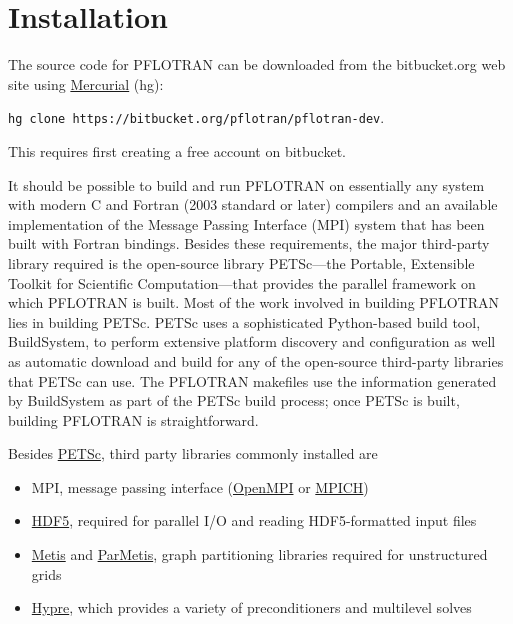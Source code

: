 \section{Installation}

\setcounter{equation}{0}

The source code for PFLOTRAN can be downloaded from the bitbucket.org web site using \href{http://mercurial.selenic.com/}{Mercurial} (hg):

\verb|hg clone https://bitbucket.org/pflotran/pflotran-dev|.

This requires first creating a free account on bitbucket.

It should be possible to build and run PFLOTRAN on essentially any system with 
modern C and Fortran (2003 standard or later) compilers and an available 
implementation of the Message Passing Interface (MPI) system that has been 
built with Fortran bindings.
Besides these requirements, the major third-party library required is 
the open-source library PETSc---the Portable, Extensible Toolkit for Scientific 
Computation---that provides the parallel framework on which PFLOTRAN is 
built.
Most of the work involved in building PFLOTRAN lies in building PETSc. 
PETSc uses a sophisticated Python-based build tool, BuildSystem, to perform 
extensive platform discovery and configuration as well as automatic download 
and build for any of the open-source third-party libraries that PETSc can 
use. 
The PFLOTRAN makefiles use the information generated by BuildSystem as part 
of the PETSc build process; once PETSc is built, building PFLOTRAN is  
straightforward.

Besides \href{http://www.mcs.anl.gov/petsc/}{PETSc}, third party libraries commonly installed are
\begin{itemize}
\item MPI, message passing interface (\href{http://www.open-mpi.org/}{OpenMPI} or \href{http://www.mpich.org/}{MPICH})
\item \href{http://www.hdfgroup.org/HDF5/}{HDF5}, required for parallel I/O and reading HDF5-formatted input files
\item \href{http://glaros.dtc.umn.edu/gkhome/views/metis}{Metis} and \href{http://glaros.dtc.umn.edu/gkhome/metis/parmetis/overview}{ParMetis}, graph partitioning libraries required for 
      unstructured grids
\item \href{http://acts.nersc.gov/hypre/}{Hypre}, which provides a variety of preconditioners and multilevel 
      solves
\end{itemize}

